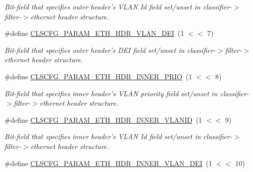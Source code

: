 \begin{DoxyCompactItemize}
\begin{DoxyCompactList}\small\item\em Bit-\/field that specifies outer header's V\-L\-A\-N Id field set/unset in classifier-\/$>$filter-\/$>$ethernet header structure. \end{DoxyCompactList}\item 
\hypertarget{group__FAPI__QOS__CLASS_gaa817956ab230bff211f3fcdc230aa7bb}{\#define \hyperlink{group__FAPI__QOS__CLASS_gaa817956ab230bff211f3fcdc230aa7bb}{C\-L\-S\-C\-F\-G\-\_\-\-P\-A\-R\-A\-M\-\_\-\-E\-T\-H\-\_\-\-H\-D\-R\-\_\-\-V\-L\-A\-N\-\_\-\-D\-E\-I}~(1 $<$$<$ 7)}\label{group__FAPI__QOS__CLASS_gaa817956ab230bff211f3fcdc230aa7bb}

\begin{DoxyCompactList}\small\item\em Bit-\/field that specifies outer header's D\-E\-I field set/unset in classifier-\/$>$filter-\/$>$ethernet header structure. \end{DoxyCompactList}\item 
\hypertarget{group__FAPI__QOS__CLASS_gaea94f73aa52b7240d76ba7979e8f0908}{\#define \hyperlink{group__FAPI__QOS__CLASS_gaea94f73aa52b7240d76ba7979e8f0908}{C\-L\-S\-C\-F\-G\-\_\-\-P\-A\-R\-A\-M\-\_\-\-E\-T\-H\-\_\-\-H\-D\-R\-\_\-\-I\-N\-N\-E\-R\-\_\-\-P\-R\-I\-O}~(1 $<$$<$ 8)}\label{group__FAPI__QOS__CLASS_gaea94f73aa52b7240d76ba7979e8f0908}

\begin{DoxyCompactList}\small\item\em Bit-\/field that specifies inner header's V\-L\-A\-N priority field set/unset in classifier-\/$>$filter-\/$>$ethernet header structure. \end{DoxyCompactList}\item 
\hypertarget{group__FAPI__QOS__CLASS_ga290fa0019b1ff3a1f0bf72860538303b}{\#define \hyperlink{group__FAPI__QOS__CLASS_ga290fa0019b1ff3a1f0bf72860538303b}{C\-L\-S\-C\-F\-G\-\_\-\-P\-A\-R\-A\-M\-\_\-\-E\-T\-H\-\_\-\-H\-D\-R\-\_\-\-I\-N\-N\-E\-R\-\_\-\-V\-L\-A\-N\-I\-D}~(1 $<$$<$ 9)}\label{group__FAPI__QOS__CLASS_ga290fa0019b1ff3a1f0bf72860538303b}

\begin{DoxyCompactList}\small\item\em Bit-\/field that specifies inner header's V\-L\-A\-N Id field set/unset in classifier-\/$>$filter-\/$>$ethernet header structure. \end{DoxyCompactList}\item 
\hypertarget{group__FAPI__QOS__CLASS_ga084af8664bb692d9d459258f1aebf7f5}{\#define \hyperlink{group__FAPI__QOS__CLASS_ga084af8664bb692d9d459258f1aebf7f5}{C\-L\-S\-C\-F\-G\-\_\-\-P\-A\-R\-A\-M\-\_\-\-E\-T\-H\-\_\-\-H\-D\-R\-\_\-\-I\-N\-N\-E\-R\-\_\-\-V\-L\-A\-N\-\_\-\-D\-E\-I}~(1 $<$$<$ 10)}\label{group__FAPI__QOS__CLASS_ga084af8664bb692d9d459258f1aebf7f5}


\end{DoxyCompactItemize}
